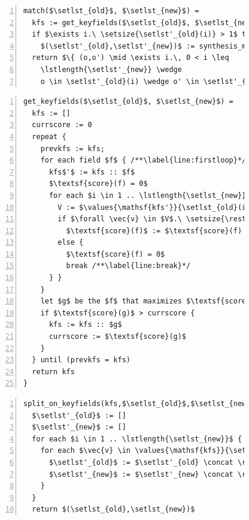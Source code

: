 \documentclass[natbib]{sigplanconf}
\begin{document}
\begin{figure}
\begin{lstlisting}[numbers=left]
match($\setlst_{old}$, $\setlst_{new}$) =
  kfs := get_keyfields($\setlst_{old}$, $\setlst_{new}$) /**\label{line:getfields}*/
  if $\exists i.\ \setsize{\setlst'_{old}(i)} > 1$ then
    $(\setlst'_{old},\setlst'_{new})$ := synthesis_match(split_on_keyfields(kfs,$\setlst_{old}$,$\setlst_{new}$)) /**\label{line:splitmatch}*/
  return $\{ (o,o') \mid \exists i.\, 0 < i \leq
    \lstlength{\setlst'_{new}} \wedge
    o \in \setlst'_{old}(i) \wedge o' \in \setlst'_{new}(i) \}$
\end{lstlisting}

\begin{lstlisting}[numbers=left,firstnumber=last]
get_keyfields($\setlst_{old}$, $\setlst_{new}$) =
  kfs := []
  currscore := 0
  repeat {
    prevkfs := kfs;
    for each field $f$ { /**\label{line:firstloop}*/
      kfs$'$ := kfs :: $f$
      $\textsf{score}(f) = 0$
      for each $i \in 1 .. \lstlength{\setlst_{new}}$ {  /**\label{line:innerloop}*/
        V := $\values{\mathsf{kfs'}}{\setlst_{old}(i)}$
        if $\forall \vec{v} \in $V$.\ \setsize{\restrictval{\set_{old}(i)}{\mathsf{kfs'}}{\vec{v}}} = \setsize{\restrictval{\set_{new}(i)}{\mathsf{kfs'}}{\vec{v}}}$ then /**\label{line:if-val}*/
          $\textsf{score}(f)$ := $\textsf{score}(f) + \setsize{$V$}$
        else {
          $\textsf{score}(f) = 0$
          break /**\label{line:break}*/
      } }
    }
    let $g$ be the $f$ that maximizes $\textsf{score}(f)$
    if $\textsf{score}(g)$ > currscore {
      kfs := kfs :: $g$
      currscore := $\textsf{score}(g)$
    }
  } until (prevkfs = kfs)
  return kfs
}
\end{lstlisting}

\begin{lstlisting}[numbers=left,firstnumber=last]
split_on_keyfields(kfs,$\setlst_{old}$,$\setlst_{new}$) =
  $\setlst'_{old}$ := []
  $\setlst'_{new}$ := []
  for each $i \in 1 .. \lstlength{\setlst_{new}}$ {
    for each $\vec{v} \in \values{\mathsf{kfs}}{\setlst_{old}(i) \cup \setlst_{new}(i)}$ {
      $\setlst'_{old}$ := $\setlst'_{old} \concat \restrictval{\set_{old}(i)}{\mathsf{kfs}}{\vec{v}}$
      $\setlst'_{new}$ := $\setlst'_{new} \concat \restrictval{\set_{new}(i)}{\mathsf{kfs}}{\vec{v}}$
    }
  }
  return $(\setlst_{old},\setlst_{new})$
\end{lstlisting}


\end{figure}
\end{document}
